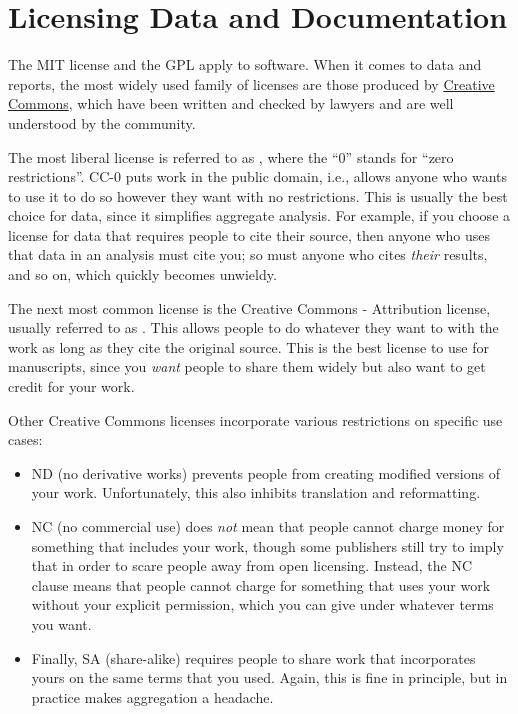 \section{Licensing Data and Documentation}\label{s:collab-datadocs}

The MIT license and the GPL apply to software.
When it comes to data and reports,
the most widely used family of licenses are those produced by \href{https://creativecommons.org/}{Creative Commons},
which have been written and checked by lawyers and are well understood by the community.

The most liberal license is referred to as ,
where the ``0'' stands for ``zero restrictions''.
CC-0 puts work in the public domain,
i.e.,
allows anyone who wants to use it to do so however they want with no restrictions.
This is usually the best choice for data,
since it simplifies aggregate analysis.
For example,
if you choose a license for data that requires people to cite their source,
then anyone who uses that data in an analysis must cite you;
so must anyone who cites \emph{their} results,
and so on,
which quickly becomes unwieldy.

The next most common license is the Creative Commons - Attribution license,
usually referred to as .
This allows people to do whatever they want to with the work
as long as they cite the original source.
This is the best license to use for manuscripts,
since you \emph{want} people to share them widely
but also want to get credit for your work.

Other Creative Commons licenses incorporate various restrictions on specific use cases:

\begin{itemize}
\item
  ND (no derivative works) prevents people from creating modified versions of your work.
  Unfortunately, this also inhibits translation and reformatting.
\item
  NC (no commercial use) does \emph{not} mean that people cannot charge money for something that includes your work,
  though some publishers still try to imply that in order to scare people away from open licensing.
  Instead,
  the NC clause means that people cannot charge for something that uses your work without your explicit permission,
  which you can give under whatever terms you want.
\item
  Finally,
  SA (share-alike) requires people to share work that incorporates yours
  on the same terms that you used.
  Again,
  this is fine in principle,
  but in practice makes aggregation a headache.
\end{itemize}

